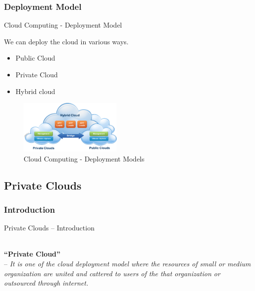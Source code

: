 \documentclass[xcolor=dvipsnames]{beamer}
\begin{document}
\subsubsection{Deployment Model }
\begin{frame}{Cloud Computing - Deployment Model }

We can deploy the cloud in various ways.

\begin{itemize}
\item Public Cloud
\item Private Cloud
\item Hybrid cloud
\end{itemize}

\begin{figure}[H]
 \centering
 \includegraphics[width=5cm]{./model.png}
 \caption{Cloud Computing - Deployment Models \label{fig:model} }
\end{figure}
\end{frame}
\subsection{Private Clouds}
\subsubsection{Introduction}
\begin{frame}{Private Clouds -- Introduction}


\hspace{4cm}\\

\textbf{``Private Cloud''} \\ 
\hspace{16mm} -- \textit{It is one of the cloud deployment model where the resources of small or medium organization are united and cattered to users of the that organization or outsourced through internet.} 

\end{frame}
\end{document}
